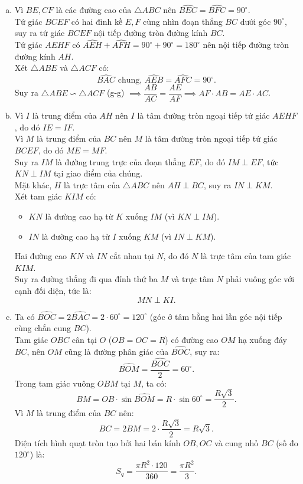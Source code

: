 \begin{bt}
{\begin{center}
\end{center}
\begin{enumerate}[a)]
    \item Vì $BE, CF$ là các đường cao của $\triangle ABC$ nên $\widehat{BEC} = \widehat{BFC} = 90^\circ$.\\
    Tứ giác $BCEF$ có hai đỉnh kề $E, F$ cùng nhìn đoạn thẳng $BC$ dưới góc $90^\circ$, suy ra tứ giác $BCEF$ nội tiếp đường tròn đường kính $BC$.\\
    Tứ giác $AEHF$ có $\widehat{AEH} + \widehat{AFH} = 90^\circ + 90^\circ = 180^\circ$ nên nội tiếp đường tròn đường kính $AH$.\\
    Xét $\triangle ABE$ và $\triangle ACF$ có:
    $$\widehat{BAC}\text{ chung, } \widehat{AEB} = \widehat{AFC} = 90^\circ.$$
    Suy ra $\triangle ABE \backsim \triangle ACF$ (g-g) $\implies \dfrac{AB}{AC} = \dfrac{AE}{AF} \implies AF \cdot AB = AE \cdot AC$.
    \item Vì $I$ là trung điểm của $AH$ nên $I$ là tâm đường tròn ngoại tiếp tứ giác $AEHF$, do đó $IE = IF$.\\
    Vì $M$ là trung điểm của $BC$ nên $M$ là tâm đường tròn ngoại tiếp tứ giác $BCEF$, do đó $ME = MF$.\\
    Suy ra $IM$ là đường trung trực của đoạn thẳng $EF$, do đó $IM \perp EF$, tức $KN \perp IM$ tại giao điểm của chúng.\\
    Mặt khác, $H$ là trực tâm của $\triangle ABC$ nên $AH \perp BC$, suy ra $IN \perp KM$.\\
    Xét tam giác $KIM$ có:
    \begin{itemize}
        \item $KN$ là đường cao hạ từ $K$ xuống $IM$ (vì $KN \perp IM$).
        \item $IN$ là đường cao hạ từ $I$ xuống $KM$ (vì $IN \perp KM$).
    \end{itemize}
    Hai đường cao $KN$ và $IN$ cắt nhau tại $N$, do đó $N$ là trực tâm của tam giác $KIM$.\\
    Suy ra đường thẳng đi qua đỉnh thứ ba $M$ và trực tâm $N$ phải vuông góc với cạnh đối diện, tức là:
    $$MN \perp KI.$$
    \item Ta có $\widehat{BOC} = 2\widehat{BAC} = 2 \cdot 60^\circ = 120^\circ$ (góc ở tâm bằng hai lần góc nội tiếp cùng chắn cung $BC$).\\
    Tam giác $OBC$ cân tại $O$ ($OB = OC = R$) có đường cao $OM$ hạ xuống đáy $BC$, nên $OM$ cũng là đường phân giác của $\widehat{BOC}$, suy ra:
    $$\widehat{BOM} = \dfrac{\widehat{BOC}}{2} = 60^\circ.$$
    Trong tam giác vuông $OBM$ tại $M$, ta có:
    $$BM = OB \cdot \sin \widehat{BOM} = R \cdot \sin 60^\circ = \dfrac{R\sqrt{3}}{2}.$$
    Vì $M$ là trung điểm của $BC$ nên:
    $$BC = 2BM = 2 \cdot \dfrac{R\sqrt{3}}{2} = R\sqrt{3}.$$
    Diện tích hình quạt tròn tạo bởi hai bán kính $OB, OC$ và cung nhỏ $BC$ (số đo $120^\circ$) là:
    $$S_q = \dfrac{\pi R^2 \cdot 120}{360} = \dfrac{\pi R^2}{3}.$$
\end{enumerate}
}
\end{bt}

